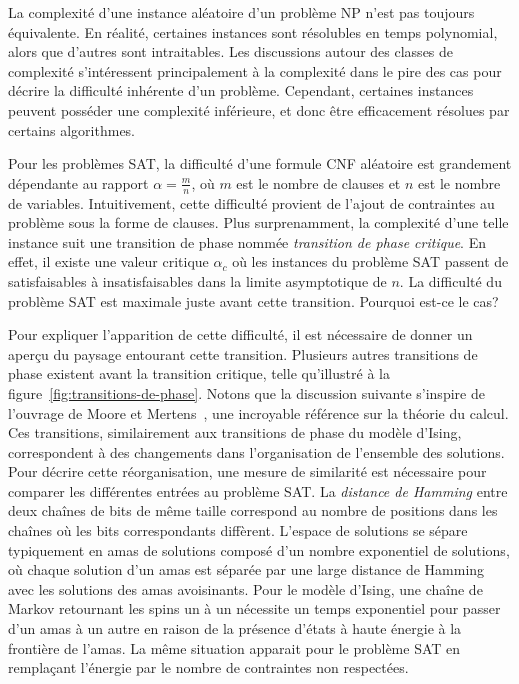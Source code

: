 La complexité d'une instance aléatoire d'un problème \textsf{NP} n'est pas toujours équivalente. En réalité, certaines instances sont résolubles en temps polynomial, alors que d'autres sont intraitables. Les discussions autour des classes de complexité s'intéressent principalement à la complexité dans le pire des cas pour décrire la difficulté inhérente d'un problème. Cependant, certaines instances peuvent posséder une complexité inférieure, et donc être efficacement résolues par certains algorithmes. 

Pour les problèmes SAT, la difficulté d'une formule CNF aléatoire est grandement dépendante au rapport $\alpha = \frac{m}{n}$, où $m$ est le nombre de clauses et $n$ est le nombre de variables. Intuitivement, cette difficulté provient de l'ajout de contraintes au problème sous la forme de clauses. Plus surprenamment, la complexité d'une telle instance suit une transition de phase nommée \textit{transition de phase critique}. En effet, il existe une valeur critique $\alpha_{c}$ où les instances du problème SAT passent de satisfaisables à insatisfaisables dans la limite asymptotique de $n$. La difficulté du problème SAT est maximale juste avant cette transition. Pourquoi est-ce le cas? 

Pour expliquer l'apparition de cette difficulté, il est nécessaire de donner un aperçu du paysage entourant cette transition. Plusieurs autres transitions de phase existent avant la transition critique, telle qu'illustré à la figure~\ref{fig:transitions-de-phase}. Notons que la discussion suivante s'inspire de l'ouvrage de Moore et Mertens~\cite{mooreNatureComputation2011}, une incroyable référence sur la théorie du calcul. Ces transitions, similairement aux transitions de phase du modèle d'Ising, correspondent à des changements dans l'organisation de l'ensemble des solutions. Pour décrire cette réorganisation, une mesure de similarité est nécessaire pour comparer les différentes entrées au problème SAT. La \textit{distance de Hamming} entre deux chaînes de bits de même taille correspond au nombre de positions dans les chaînes où les bits correspondants diffèrent. L'espace de solutions se sépare typiquement en amas de solutions composé d'un nombre exponentiel de solutions, où chaque solution d'un amas est séparée par une large distance de Hamming avec les solutions des amas avoisinants. Pour le modèle d'Ising, une chaîne de Markov retournant les spins un à un nécessite un temps exponentiel pour passer d'un amas à un autre en raison de la présence d'états à haute énergie à la frontière de l'amas. La même situation apparait pour le problème SAT en remplaçant l'énergie par le nombre de contraintes non respectées.


